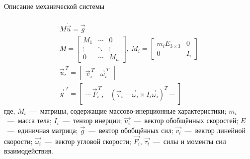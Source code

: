 \begin{frame}[t]{Описание механической системы}
    \framesubtitle{}
    \begin{align}
        M \dot{\vec{u}} = \vec{g}                                \\
        M = \begin{bmatrix}
                M_1    & \cdots & 0      \\
                \vdots & \ddots & \vdots \\
                0      & \cdots & M_n
            \end{bmatrix},\ M_i = \begin{bmatrix}
                                      m_i E_{3\times 3} & 0   \\
                                      0                 & I_i
                                  \end{bmatrix}        \\
        \vec{u}_i^{\ T} = \begin{bmatrix}
                              \vec{v}_i^{\ T} & \vec{\omega}_i^{\ T}
                          \end{bmatrix} \\
        \vec{g}^{\ T} = \begin{bmatrix}
                            \cdots \  \vec{F}_i^{\ T}, & (\vec{\tau}_i - \vec{\omega}_i \times I_i \vec{\omega}_i)^T\  \cdots
                        \end{bmatrix}
    \end{align}
    где, $M_i$~---~матрицы, содержащие массово-инерционные характеристики; $m_i$~---~масса тела; $I_i$~---~тензор инерции; $\vec{u_i}$~---~вектор обобщённых скоростей; $E$~---~единичная матрица; $\vec{g}$~---~вектор обобщённых сил; $\vec{v_i}$~---~вектор линейной скорости; $\vec{\omega_i}$~---~вектор угловой скорости; $\vec{F_i}$, $\vec{\tau_i}$~---~силы и моменты сил взаимодействия.
\end{frame}


